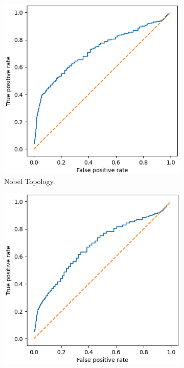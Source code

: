 \begin{figure}[H]
    \centering
    \begin{subfigure}{0.475\textwidth}
        \includegraphics[width=\textwidth]{figs/results/nobel-germany_case2_roc.png}
        \caption{Nobel Topology.}
    \end{subfigure}
    \begin{subfigure}{0.475\textwidth}
        \includegraphics[width=\textwidth]{figs/results/france_case2_roc.png}

\end{subfigure}
\end{figure}
